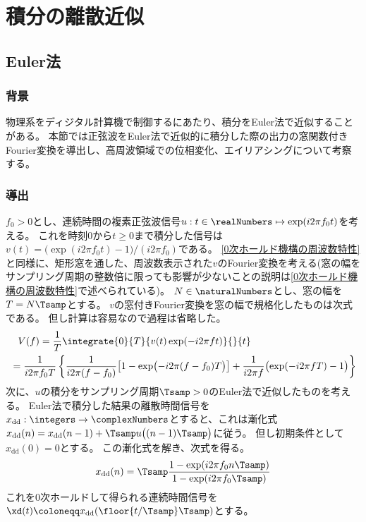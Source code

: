 \chapter{積分の離散近似}
    \section{Euler法}
        \subsection{背景}
            物理系をディジタル計算機で制御するにあたり、積分をEuler法で近似することがある。
            本節では正弦波をEuler法で近似的に積分した際の出力の窓関数付きFourier変換を導出し、高周波領域での位相変化、エイリアシングについて考察する。
        \subsection{導出}
            \newcommand{\xdd}{x_\text{dd}}
            $f_0>0$とし、連続時間の複素正弦波信号$u:t\in\realNumbers\mapsto\exp(i 2\pi f_0 t)$を考える。
            これを時刻$0$から$t\geq 0$まで積分した信号は$v(t) = \bigl(\exp(i 2\pi f_0 t)-1\bigr) / (i 2\pi f_0)$である。
            \ref{0次ホールド機構の周波数特性}と同様に、矩形窓を通した、周波数表示された$v$のFourier変換を考える(窓の幅をサンプリング周期の整数倍に限っても影響が少ないことの説明は\ref{0次ホールド機構の周波数特性}で述べられている)。
            $N\in\naturalNumbers$とし、窓の幅を$T=N\Tsamp$とする。
            $v$の窓付きFourier変換を窓の幅で規格化したものは次式である。
            但し計算は容易なので過程は省略した。
            \begin{align*}
                &\phantom{=} V(f) = \frac{1}{T} \integrate{0}{T}{v(t)\exp(-i 2\pi f t)}{}{t} \\
                &= \frac{1}{i 2\pi f_0 T} \left\{\frac{1}{i 2\pi (f-f_0)}\bigl[1 - \exp\bigl(-i 2\pi (f-f_0)T\bigr)\bigr] + \frac{1}{i 2\pi f}\bigl(\exp(-i 2\pi f T) - 1\bigr)\right\}
            \end{align*}
            次に、$u$の積分をサンプリング周期$\Tsamp>0$のEuler法で近似したものを考える。
            Euler法で積分した結果の離散時間信号を$\xdd:\integers\to\complexNumbers$とすると、これは漸化式$\xdd(n) = \xdd(n-1) + \Tsamp u\bigl((n-1)\Tsamp\bigr)$に従う。
            但し初期条件として$\xdd(0)=0$とする。
            この漸化式を解き、次式を得る。
            \[ \xdd(n) = \Tsamp\frac{1-\exp(i 2\pi f_0 n\Tsamp)}{1-\exp(i 2\pi f_0\Tsamp)} \]
            これを0次ホールドして得られる連続時間信号を$\xd(t) \coloneqq \xdd(\floor{t/\Tsamp}\Tsamp)$とする。
